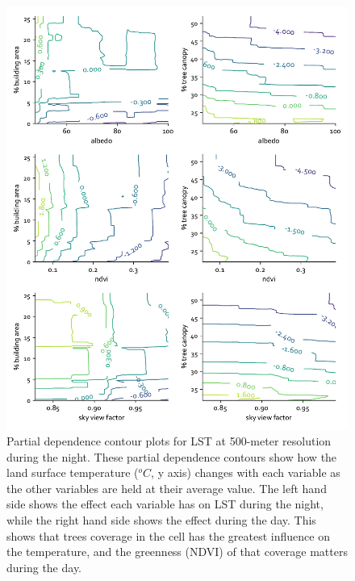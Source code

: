 \documentclass[review]{elsarticle}
\begin{document}
\begin{figure}[h]
    \centering
    \includegraphics[width=\linewidth]{fig/report/pdp_2d_night_500.pdf}
    \caption[Partial dependence contour plots for LST at 500-meter resolution during the night]{
    Partial dependence contour plots for LST at 500-meter resolution during the night.
    These partial dependence contours show how the land surface temperature ($^oC$, y axis) changes with each variable as the other variables are held at their average value. The left hand side shows the effect each variable has on LST during the night, while the right hand side shows the effect during the day. This shows that trees coverage in the cell has the greatest influence on the temperature, and the greenness (NDVI) of that coverage matters during the day.
    }
    \label{fig:pdp_2dnight_500}
\end{figure}
\end{document}
